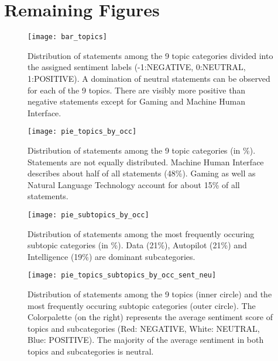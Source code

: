 \section{Remaining Figures}
\begin{figure}[h!]
    \centering
    \texttt{[image: bar\_topics]}
    \caption{
        Distribution of statements among the 9 topic categories divided into the assigned sentiment labels (-1:NEGATIVE, 0:NEUTRAL, 1:POSITIVE).
        A domination of neutral statements can be observed for each of the 9 topics.
        There are visibly more positive than negative statements except for Gaming and Machine Human Interface.
    }
    \label{fig:bar_topics}
    \texttt{[image: pie\_topics\_by\_occ]}
    \caption{
        Distribution of statements among the 9 topic categories (in \%). 
        Statements are not equally distributed.
        Machine Human Interface describes about half of all statements (48\%).
        Gaming as well as Natural Language Technology account for about 15\% of all statements.
    }
    \label{fig:pie_topics_by_occ}
\end{figure}
\pagebreak
\begin{figure}[h!]
    \centering
    \texttt{[image: pie\_subtopics\_by\_occ]}
    \caption{
        Distribution of statements among the most frequently occuring subtopic categories (in \%).
        Data (21\%), Autopilot (21\%) and Intelligence (19\%) are dominant subcategories.
    }
    \label{fig:pie_subtopics_by_occ}
    \texttt{[image: pie\_topics\_subtopics\_by\_occ\_sent\_neu]}
    \caption{
        Distribution of statements among the 9 topics (inner circle) and the most frequently occuring subtopic categories (outer circle).
        The Colorpalette (on the right) represents the average sentiment score of topics and subcategories (Red: NEGATIVE, White: NEUTRAL, Blue: POSITIVE).
        The majority of the average sentiment in both topics and subcategories is neutral.
    }
    \label{fig:pie_topics_subtopics_by_occ_sent_neu}
\end{figure}
